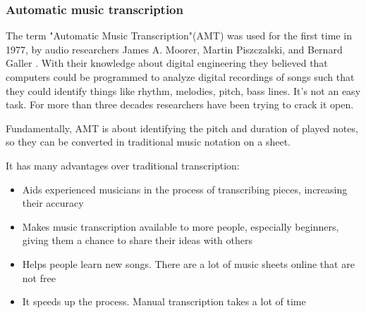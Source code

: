 \subsubsection{Automatic music transcription}
The term "Automatic Music Transcription"(AMT) was used for the first time in 1977, by audio researchers James A. Moorer, Martin Piszczalski, and Bernard Galler \cite{transcription}. With their knowledge about digital engineering they believed that computers could be programmed to analyze digital recordings of songs such that they could identify things like rhythm, melodies, pitch, bass lines. It's not an easy task. For more than three decades researchers have been trying to crack it open. \par

Fundamentally, AMT is about identifying the pitch and duration of played notes, so they can be converted in traditional music notation on a sheet. \par

It has many advantages over traditional transcription:
\begin{itemize}
	\item Aids experienced musicians in the process of transcribing pieces, increasing their accuracy
	\item Makes music transcription available to more people, especially beginners, giving them a chance to share their ideas with others
	\item Helps people learn new songs. There are a lot of music sheets online that are not free 
	\item It speeds up the process. Manual transcription takes a lot of time
\end{itemize}

